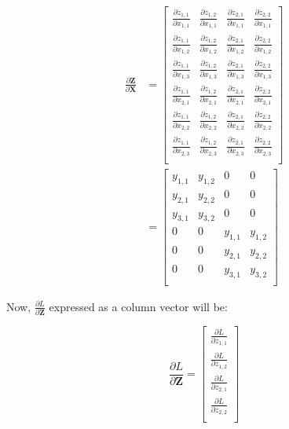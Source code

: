\documentclass{article}
\newcommand{\matr}[1]{\mathbf{#1}} %
\begin{document}
\begin{align}
\frac{\partial \matr{Z}}{\partial \matr{X}} &=
\begin{bmatrix}
\frac{\partial z_{1,1}}{\partial x_{1,1}} & \frac{\partial z_{1,2}}{\partial x_{1,1}} & \frac{\partial z_{2,1}}{\partial x_{1,1}} & \frac{\partial z_{2,2}}{\partial x_{1,1}} \\[0.5em]
\frac{\partial z_{1,1}}{\partial x_{1,2}} & \frac{\partial z_{1,2}}{\partial x_{1,2}} & \frac{\partial z_{2,1}}{\partial x_{1,2}} & \frac{\partial z_{2,2}}{\partial x_{1,2}} \\[0.5em]
\frac{\partial z_{1,1}}{\partial x_{1,3}} & \frac{\partial z_{1,2}}{\partial x_{1,3}} & \frac{\partial z_{2,1}}{\partial x_{1,3}} & \frac{\partial z_{2,2}}{\partial x_{1,3}} \\[0.5em]
\frac{\partial z_{1,1}}{\partial x_{2,1}} & \frac{\partial z_{1,2}}{\partial x_{2,1}} & \frac{\partial z_{2,1}}{\partial x_{2,1}} & \frac{\partial z_{2,2}}{\partial x_{2,1}} \\[0.5em]
\frac{\partial z_{1,1}}{\partial x_{2,2}} & \frac{\partial z_{1,2}}{\partial x_{2,2}} & \frac{\partial z_{2,1}}{\partial x_{2,2}} & \frac{\partial z_{2,2}}{\partial x_{2,2}} \\[0.5em]
\frac{\partial z_{1,1}}{\partial x_{2,3}} & \frac{\partial z_{1,2}}{\partial x_{2,3}} & \frac{\partial z_{2,1}}{\partial x_{2,3}} & \frac{\partial z_{2,2}}{\partial x_{2,3}} \\[0.5em]
\end{bmatrix} \nonumber
\\ \label{dZbydX}
&=
\begin{bmatrix}
y_{1,1} & y_{1,2} & 0 & 0 \\[0.5em]
y_{2,1} & y_{2,2} & 0 & 0 \\[0.5em]
y_{3,1} & y_{3,2} & 0 & 0 \\[0.5em]
0 & 0 & y_{1,1} & y_{1,2} \\[0.5em]
0 & 0 & y_{2,1} & y_{2,2} \\[0.5em]
0 & 0 & y_{3,1} & y_{3,2} \\[0.5em]
\end{bmatrix}
\end{align}

Now, $\frac{\partial L}{\partial \matr{Z}}$ expressed as a column vector will be:

\begin{equation} \label{dZAsColumnVector}
\frac{\partial L}{\partial \matr{Z}} =
\begin{bmatrix}
\frac{\partial L}{\partial z_{1,1}} \\[0.7em]
\frac{\partial L}{\partial z_{1,2}} \\[0.7em]
\frac{\partial L}{\partial z_{2,1}} \\[0.7em]
\frac{\partial L}{\partial z_{2,2}} \\[0.7em]
\end{bmatrix}
\end{equation}
\end{document}
